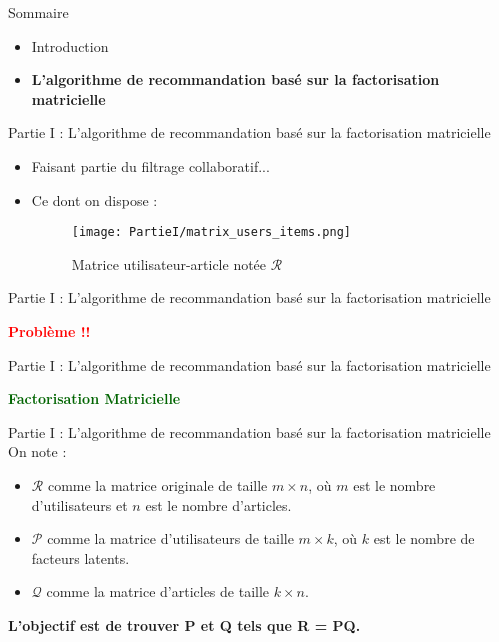 \newcommand{\PartieI}{Partie I : L'algorithme de recommandation basé sur la factorisation matricielle}

\begin{frame}{Sommaire}
    \begin{itemize}
        \item Introduction
        \item \textbf{L'algorithme de recommandation basé sur la factorisation matricielle}
    \end{itemize}
\end{frame}

\begin{frame}{\PartieI}
    \begin{itemize}
        \item Faisant partie du filtrage collaboratif...
        \item {
              Ce dont on dispose :
              \begin{figure}[htbp]
                  \centering
                  \hspace{80pt}
                  \texttt{[image: PartieI/matrix\_users\_items.png]}
                  \caption{Matrice utilisateur-article notée $\mathcal{R}$}
                  \label{fig:matrix-user-article}
              \end{figure}
              }
    \end{itemize}
\end{frame}

\begin{frame}{\PartieI}
    \begin{center}
        \textcolor{red}{\textbf{\large{Problème !!}}}
    \end{center}
\end{frame}

\begin{frame}{\PartieI}
    \begin{center}
        \textcolor{darkgreen}{\textbf{\large{Factorisation Matricielle}}}
    \end{center}
\end{frame}

\begin{frame}{\PartieI}
    On note :
    \begin{itemize}
        \item $\mathcal{R}$ comme la matrice originale de taille $m \times n$, où $m$ est le nombre d'utilisateurs et $n$ est le nombre d'articles.
        \item $\mathcal{P}$ comme la matrice d'utilisateurs de taille $m \times k$, où $k$ est le nombre de facteurs latents.
        \item $\mathcal{Q}$ comme la matrice d'articles de taille $k \times n$.
    \end{itemize}
    \begin{center}
        \textbf{L'objectif est de trouver P et Q tels que R = PQ.}
    \end{center}
\end{frame}

